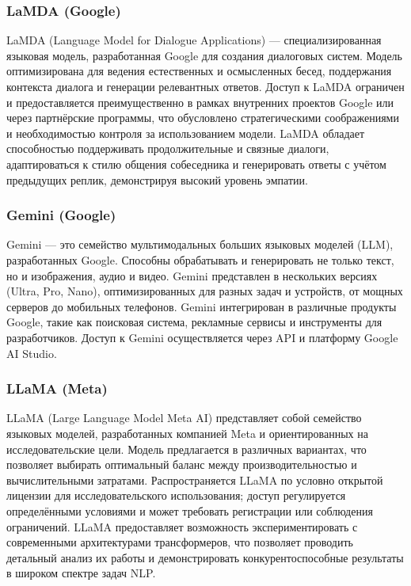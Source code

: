 \subsubsection{LaMDA (Google)}

LaMDA (Language Model for Dialogue Applications) — специализированная языковая модель, разработанная Google для создания диалоговых систем. Модель оптимизирована для ведения естественных и осмысленных бесед, поддержания контекста диалога и генерации релевантных ответов. Доступ к LaMDA ограничен и предоставляется преимущественно в рамках внутренних проектов Google или через партнёрские программы, что обусловлено стратегическими соображениями и необходимостью контроля за использованием модели. LaMDA обладает способностью поддерживать продолжительные и связные диалоги, адаптироваться к стилю общения собеседника и генерировать ответы с учётом предыдущих реплик, демонстрируя высокий уровень эмпатии.

\subsubsection{Gemini (Google)}

Gemini — это семейство мультимодальных больших языковых моделей (LLM), разработанных Google. Способны обрабатывать и генерировать не только текст, но и изображения, аудио и видео. Gemini представлен в нескольких версиях (Ultra, Pro, Nano), оптимизированных для разных задач и устройств, от мощных серверов до мобильных телефонов. Gemini интегрирован в различные продукты Google, такие как поисковая система, рекламные сервисы и инструменты для разработчиков. Доступ к Gemini осуществляется через API и платформу Google AI Studio.

\subsubsection{LLaMA (Meta)}

LLaMA (Large Language Model Meta AI) представляет собой семейство языковых моделей, разработанных компанией Meta и ориентированных на исследовательские цели. Модель предлагается в различных вариантах, что позволяет выбирать оптимальный баланс между производительностью и вычислительными затратами. Распространяется LLaMA по условно открытой лицензии для исследовательского использования; доступ регулируется определёнными условиями и может требовать регистрации или соблюдения ограничений. LLaMA предоставляет возможность экспериментировать с современными архитектурами трансформеров, что позволяет проводить детальный анализ их работы и демонстрировать конкурентоспособные результаты в широком спектре задач NLP.

